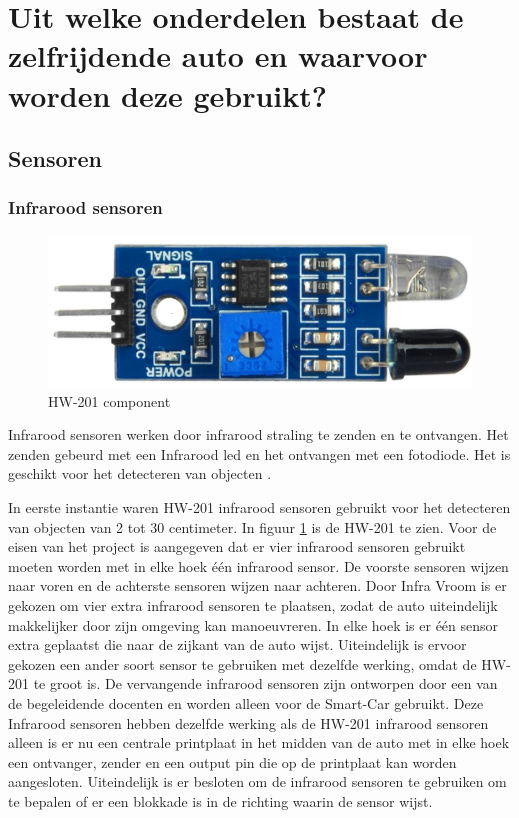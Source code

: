 \section{Uit welke onderdelen bestaat de zelfrijdende auto en waarvoor worden deze gebruikt?}
\subsection{Sensoren}
\subsubsection{Infrarood sensoren}
\begin{figure}[h]
    \centering
    \includegraphics[scale = 0.35]{Media/Figuren/HW-201.jpg}
    \caption{HW-201 component}
    \label{HW-201}
\end{figure}
Infrarood sensoren werken door infrarood straling te zenden en te ontvangen. Het zenden gebeurd met een Infrarood led en het ontvangen met een fotodiode. Het is geschikt voor het detecteren van objecten \cite{IR-datasheet}.

In eerste instantie waren \gls{HW-201} infrarood sensoren gebruikt voor het detecteren van objecten van 2 tot 30 centimeter. In figuur \ref{HW-201}\cite{HW-201-hardware} is de \gls{HW-201} te zien. Voor de eisen van het project is aangegeven dat er vier infrarood sensoren gebruikt moeten worden met in elke hoek één infrarood sensor. De voorste sensoren wijzen naar voren en de achterste sensoren wijzen naar achteren. Door Infra Vroom is er gekozen om vier extra infrarood sensoren te plaatsen, zodat de auto uiteindelijk makkelijker door zijn omgeving kan manoeuvreren. In elke hoek is er één sensor extra geplaatst die naar de zijkant van de auto wijst. Uiteindelijk is ervoor gekozen een ander soort sensor te gebruiken met dezelfde werking, omdat de \gls{HW-201} te groot is. De vervangende infrarood sensoren zijn ontworpen door een van de begeleidende docenten en worden alleen voor de \gls{Smart-Car} gebruikt. Deze Infrarood sensoren hebben dezelfde werking als de \gls{HW-201} infrarood sensoren alleen is er nu een centrale printplaat in het midden van de auto met in elke hoek een ontvanger, zender en een output pin die op de printplaat kan worden aangesloten. Uiteindelijk is er besloten om de infrarood sensoren te gebruiken om te bepalen of er een blokkade is in de richting waarin de sensor wijst.
